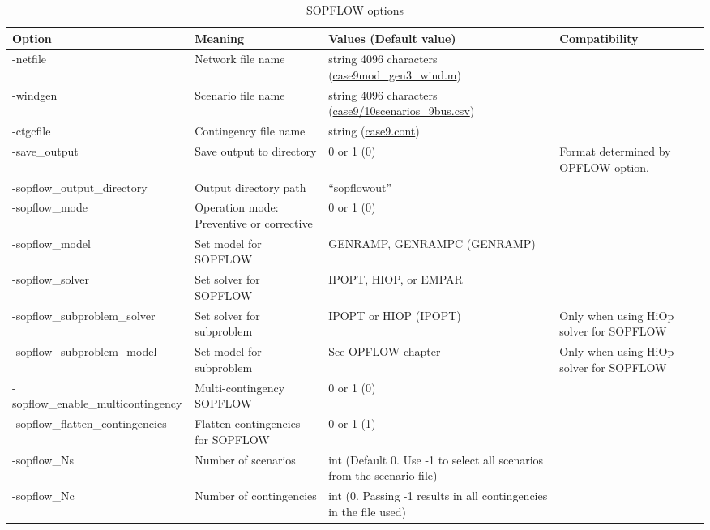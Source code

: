 \begin{table}[H]
  \caption{SOPFLOW options}
  \small
  \begin{tabular}{|p{}|p{}|p{}|p{}|}
    \hline
    \textbf{Option} & \textbf{Meaning} & \textbf{Values (Default value)} & \textbf{Compatibility} \\ \hline
    -netfile & Network file name & string 4096 characters (\href{https://github.com/ORNL/ExaGO/tree/develop/datafiles/case9/case9mod_gen3_wind.m}{case9mod\_gen3\_wind.m}) &\\ \hline
    -windgen & Scenario file name & string 4096 characters (\href{https://github.com/ORNL/ExaGO/tree/develop/datafiles/case9/10scenarios_9bus.csv}{case9/10scenarios\_9bus.csv}) &\\ \hline
    -ctgcfile & Contingency file name & string (\href{https://github.com/ORNL/ExaGO/tree/develop/datafiles/case9/case9.cont}{case9.cont}) &\\ \hline
    -save\_output & Save output to directory & 0 or 1 (0) & Format determined by OPFLOW option. \\ \hline
    -sopflow\_output\_directory & Output directory path & ``sopflowout'' & \\ \hline
    -sopflow\_mode & Operation mode: Preventive or corrective & 0 or 1 (0) &\\ \hline
    -sopflow\_model & Set model for SOPFLOW & GENRAMP, GENRAMPC (GENRAMP) &\\ \hline
    -sopflow\_solver & Set solver for SOPFLOW & IPOPT, HIOP, or  EMPAR &\\ \hline
    -sopflow\_subproblem\_solver & Set solver for subproblem & IPOPT or HIOP (IPOPT) &Only when using HiOp solver for SOPFLOW \\ \hline
    -sopflow\_subproblem\_model & Set model for subproblem & See OPFLOW chapter &Only when using HiOp solver for SOPFLOW \\ \hline
    -sopflow\_enable\_multicontingency & Multi-contingency SOPFLOW & 0 or 1 (0) &\\ \hline
    -sopflow\_flatten\_contingencies & Flatten contingencies for SOPFLOW & 0 or 1 (1) &\\ \hline
    -sopflow\_Ns & Number of scenarios & int (Default 0. Use -1 to select all scenarios from the scenario file) &\\ \hline
    -sopflow\_Nc & Number of contingencies & int (0. Passing -1 results in all contingencies in the file used) &\\ \hline
  \end{tabular}
  \label{tab:sopflow_options}
\end{table}

